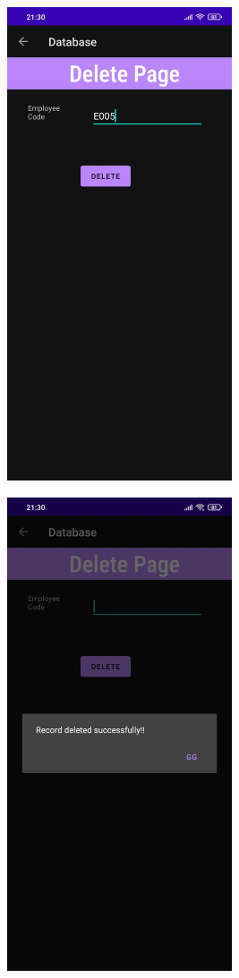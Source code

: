 \documentclass[12pt,letterpaper]{article}
\begin{document}
\subsubsection*{}
\begin{figure}[h]
    \centering
    \includegraphics[height=14cm, keepaspectratio]{Outputs/OP9.jpeg}
\end{figure}
\begin{figure}
    \centering
    \includegraphics[height=14cm, keepaspectratio]{Outputs/OP10.jpeg}
\end{figure}
\end{document}
